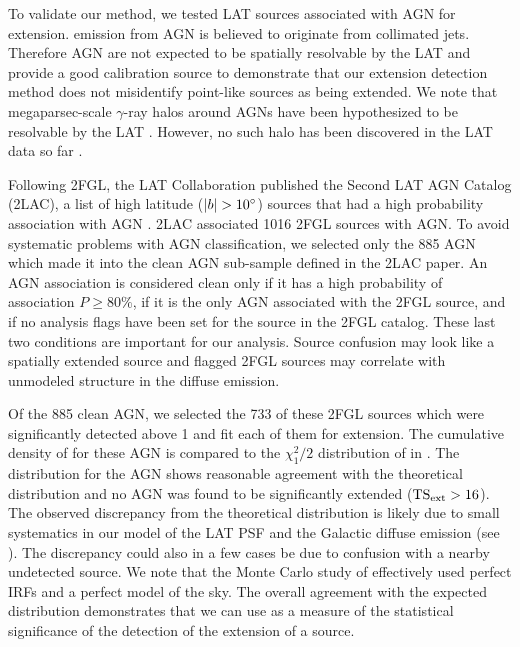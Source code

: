 To validate our method, we tested LAT sources associated with AGN for
extension.  \gev emission from AGN is believed to originate from collimated jets.  Therefore AGN are
not expected to be spatially resolvable by the LAT and provide a good
calibration source to demonstrate that our extension detection method
does not misidentify point-like sources as being extended.  We note that
megaparsec-scale $\gamma$-ray halos around AGNs have been hypothesized
to be resolvable by the LAT \citep{aharonian_1994a_energy-gamma}. However, no such
halo has been discovered in the LAT data so far \citep{neronov_2011a_evidence-gamma-ray}.

Following 2FGL, the LAT Collaboration published the Second LAT AGN
Catalog (2LAC), a list of high latitude ($|b|>10\degree$) sources
that had a high probability association with AGN \citep{ackermann_2011a_second-catalog}.
2LAC associated 1016 2FGL sources with AGN.  To avoid systematic problems
with AGN classification, we selected only the 885 AGN which made it into
the clean AGN sub-sample defined in the 2LAC paper.  An AGN association is considered clean only
if it has a high probability of association $P\ge 80\%$, if it is the
only AGN associated with the 2FGL source, and if 
no analysis flags have been set for the source
in the 2FGL catalog. These last two conditions are important for our
analysis. Source confusion may look like a spatially extended source
and flagged 2FGL sources may correlate with unmodeled structure in
the diffuse emission.

Of the 885 clean AGN, we selected the 733 of these 2FGL sources which
were significantly detected above 1 \gev and fit each of them for
extension.  The cumulative density of \tsext for these AGN is compared
to the $\chi^2_1/2$ distribution of 
in .  The \tsext distribution
for the AGN shows reasonable agreement with the theoretical
distribution and no AGN was found to be significantly extended
($\mathrm{TS}_\mathrm{ext}>16$).  The observed discrepancy from the theoretical
distribution is likely due to small systematics
in our model of the LAT PSF and the Galactic diffuse emission (see
).  
The discrepancy could
also in a few cases be due to confusion with a nearby undetected source.
We note that the Monte Carlo study
of  effectively used perfect
IRFs and a perfect model of the sky.
The overall agreement with the expected distribution demonstrates that
we can use \tsext as a measure of the statistical significance of the
detection of the extension of a source.


